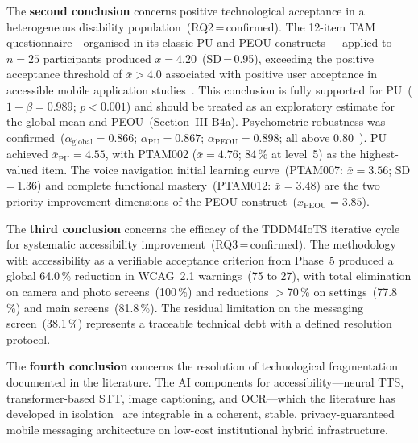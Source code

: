 \documentclass[journal]{IEEEtran}
\begin{document}
	The \textbf{second conclusion} concerns positive technological
	acceptance in a heterogeneous disability population~(RQ2\,=\,confirmed).
	The 12-item TAM questionnaire---organised in its classic PU and
	PEOU constructs~\cite{davis1989}---applied to $n{=}25$ participants
	produced $\bar{x}{=}4.20$~(SD\,=\,0.95), exceeding the positive
	acceptance threshold of $\bar{x}{>}4.0$ associated with positive
	user acceptance in accessible mobile application
	studies~\cite{kim2024,holden2010}.
	This conclusion is fully supported for PU~($1{-}\beta{=}0.989$;
	$p{<}0.001$) and should be treated as an exploratory estimate
	for the global mean and PEOU~(Section~III-B4a).
	Psychometric robustness was confirmed~($\alpha_{\text{global}}{=}0.866$;
	$\alpha_{\text{PU}}{=}0.867$; $\alpha_{\text{PEOU}}{=}0.898$;
	all above 0.80~\cite{nunnally1978}).
	PU achieved $\bar{x}_{\text{PU}}{=}4.55$, with PTAM002
	($\bar{x}{=}4.76$; 84\,\% at level~5) as the highest-valued item.
	The voice navigation initial learning curve~(PTAM007:
	$\bar{x}{=}3.56$; SD\,=\,1.36) and complete functional
	mastery~(PTAM012: $\bar{x}{=}3.48$) are the two priority
	improvement dimensions of the PEOU construct~($\bar{x}_{\text{PEOU}}{=}3.85$).
	
	The \textbf{third conclusion} concerns the efficacy of the
	TDDM4IoTS iterative cycle for systematic accessibility
	improvement~(RQ3\,=\,confirmed).
	The methodology~\cite{guerrero2020} with accessibility as a
	verifiable acceptance criterion from Phase~5 produced a global
	64.0\,\% reduction in WCAG~2.1 warnings~(75 to 27), with total
	elimination on camera and photo screens~(100\,\%) and reductions
	$>$70\,\% on settings~(77.8\,\%) and main screens~(81.8\,\%).
	The residual limitation on the messaging screen~(38.1\,\%)
	represents a traceable technical debt with a defined resolution
	protocol.
	
	The \textbf{fourth conclusion} concerns the resolution of
	technological fragmentation documented in the literature.
	The AI components for accessibility---neural TTS, transformer-based
	STT, image captioning, and OCR---which the literature has
	developed in isolation~\cite{tan2021,baevski2020,radford2023,ming2022,mukherjee2023}
	are integrable in a coherent, stable, privacy-guaranteed mobile
	messaging architecture on low-cost institutional hybrid
	infrastructure.
	
\end{document}
